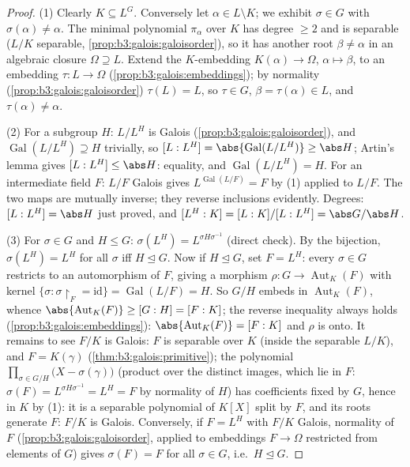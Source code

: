 \begin{proof}
(1) Clearly $K \subseteq L^G$. Conversely let $\alpha \in L
\setminus K$; we exhibit $\sigma \in G$ with $\sigma(\alpha) \ne
\alpha$. The minimal polynomial $\pi_\alpha$ over $K$ has degree
$\geq 2$ and is separable ($L/K$ separable,
\cref{prop:b3:galois:galoisorder}), so it has another root
$\beta \neq \alpha$ in an algebraic closure $\Omega \supseteq L$.
Extend the $K$-embedding $K(\alpha) \to \Omega$, $\alpha \mapsto
\beta$, to an embedding $\tau\colon L \to \Omega$
(\cref{prop:b3:galois:embeddings}); by normality
(\cref{prop:b3:galois:galoisorder}) $\tau(L) = L$, so $\tau \in
G$, $\beta = \tau(\alpha) \in L$, and $\tau(\alpha) \neq
\alpha$.

(2) For a subgroup $H$: $L/L^H$ is Galois
(\cref{prop:b3:galois:galoisorder}), and
$\operatorname{Gal}(L/L^H) \supseteq H$ trivially, so $[L:L^H] =
\abs{\operatorname{Gal}(L/L^H)} \geq \abs H$; Artin's lemma
gives $[L:L^H] \leq \abs H$: equality, and
$\operatorname{Gal}(L/L^H) = H$. For an intermediate field $F$:
$L/F$ Galois gives $L^{\operatorname{Gal}(L/F)} = F$ by (1)
applied to $L/F$. The two maps are mutually inverse; they
reverse inclusions evidently. Degrees: $[L:L^H] = \abs H$ just
proved, and $[L^H:K] = [L:K]/[L:L^H] = \abs G/\abs H$.

(3) For $\sigma \in G$ and $H \leq G$: $\sigma(L^H) =
L^{\sigma H\sigma^{-1}}$ (direct check). By the bijection,
$\sigma(L^H) = L^H$ for all $\sigma$ iff $H \trianglelefteq G$.
Now if $H \trianglelefteq G$, set $F = L^H$: every $\sigma \in
G$ restricts to an automorphism of $F$, giving a morphism $\rho
\colon G \to \operatorname{Aut}_K(F)$ with kernel $\{\sigma :
\sigma\restriction_F = \mathrm{id}\} = \operatorname{Gal}(L/F) =
H$. So $G/H$ embeds in $\operatorname{Aut}_K(F)$, whence
$\abs{\operatorname{Aut}_K(F)} \geq [G:H] = [F:K]$; the reverse
inequality always holds (\cref{prop:b3:galois:embeddings}):
$\abs{\operatorname{Aut}_K(F)} = [F:K]$ and $\rho$ is onto. It
remains to see $F/K$ is Galois: $F$ is separable over $K$
(inside the separable $L/K$), and $F = K(\gamma)$
(\cref{thm:b3:galois:primitive}); the polynomial
$\prod_{\sigma \in G/H}\bigl(X - \sigma(\gamma)\bigr)$ (product
over the distinct images, which lie in $F$: $\sigma(F) =
L^{\sigma H\sigma^{-1}} = L^H = F$ by normality of $H$) has
coefficients
fixed by $G$, hence in $K$ by (1): it is a separable polynomial
of $K[X]$ split by $F$, and its roots generate $F$: $F/K$ is
Galois. Conversely, if $F = L^H$ with $F/K$ Galois, normality of
$F$ (\cref{prop:b3:galois:galoisorder}, applied to embeddings
$F \to \Omega$ restricted from elements of $G$) gives
$\sigma(F) = F$ for all $\sigma \in G$, i.e.\ $H
\trianglelefteq G$.
\end{proof}

